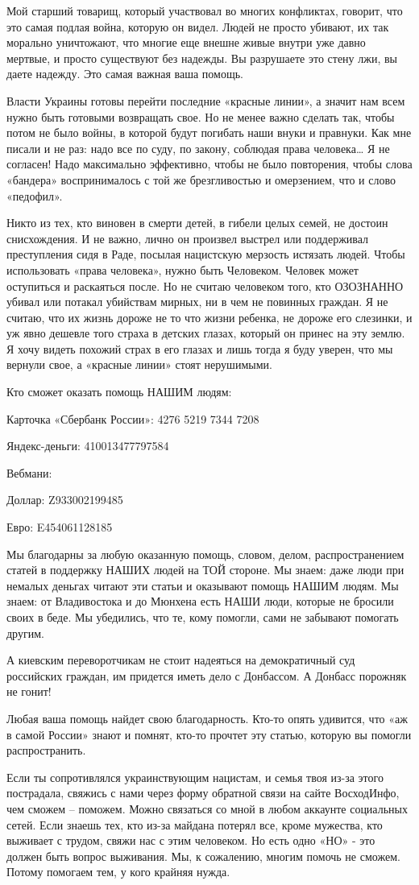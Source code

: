 Мой старший товарищ, который участвовал во многих конфликтах, говорит, что это
самая подлая война, которую он видел. Людей не просто убивают, их так морально
уничтожают, что многие еще внешне живые внутри уже давно мертвые, и просто
существуют без надежды. Вы разрушаете это стену лжи, вы даете надежду. Это
самая важная ваша помощь.

Власти Украины готовы перейти последние «красные линии», а значит нам всем
нужно быть готовыми возвращать свое. Но не менее важно сделать так, чтобы потом
не было войны, в которой будут погибать наши внуки и правнуки. Как мне писали и
не раз: надо все по суду, по закону, соблюдая права человека… Я не согласен!
Надо максимально эффективно, чтобы не было повторения, чтобы слова «бандера»
воспринималось с той же брезгливостью и омерзением, что и слово «педофил».

Никто из тех, кто виновен в смерти детей, в гибели целых семей, не достоин
снисхождения. И не важно, лично он произвел выстрел или поддерживал
преступления сидя в Раде, посылая нацистскую мерзость истязать людей. Чтобы
использовать «права человека», нужно быть Человеком. Человек может оступиться и
раскаяться после. Но не считаю человеком того, кто ОЗОЗНАННО убивал или потакал
убийствам мирных, ни в чем не повинных граждан. Я не считаю, что их жизнь
дороже не то что жизни ребенка, не дороже его слезинки, и уж явно дешевле того
страха в детских глазах, который он принес на эту землю. Я хочу видеть похожий
страх в его глазах и лишь тогда я буду уверен, что мы вернули свое, а «красные
линии» стоят нерушимыми.

Кто сможет оказать помощь НАШИМ людям: 

Карточка «Сбербанк России»: 4276 5219 7344 7208 

Яндекс-деньги: 410013477797584 

Вебмани: 

Доллар: Z933002199485 

Евро: E454061128185


Мы благодарны за любую оказанную помощь, словом, делом, распространением
статей в поддержку НАШИХ людей на ТОЙ стороне. Мы знаем: даже люди при немалых
деньгах читают эти статьи и оказывают помощь НАШИМ людям. Мы знаем: от
Владивостока и до Мюнхена есть НАШИ люди, которые не бросили своих в беде. Мы
убедились, что те, кому помогли, сами не забывают помогать другим.

А киевским переворотчикам не стоит надеяться на демократичный суд российских
граждан, им придется иметь дело с Донбассом. А Донбасс порожняк не гонит!

Любая ваша помощь найдет свою благодарность. Кто-то опять удивится, что «аж в
самой России» знают и помнят, кто-то прочтет эту статью, которую вы помогли
распространить.

Если ты сопротивлялся украинствующим нацистам, и семья твоя из-за этого
пострадала, свяжись с нами через форму обратной связи на сайте ВосходИнфо, чем
сможем – поможем. Можно связаться со мной в любом аккаунте социальных сетей.
Если знаешь тех, кто из-за майдана потерял все, кроме мужества, кто выживает с
трудом, свяжи нас с этим человеком. Но есть одно «НО» - это должен быть вопрос
выживания. Мы, к сожалению, многим помочь не сможем. Потому помогаем тем, у
кого крайняя нужда.
